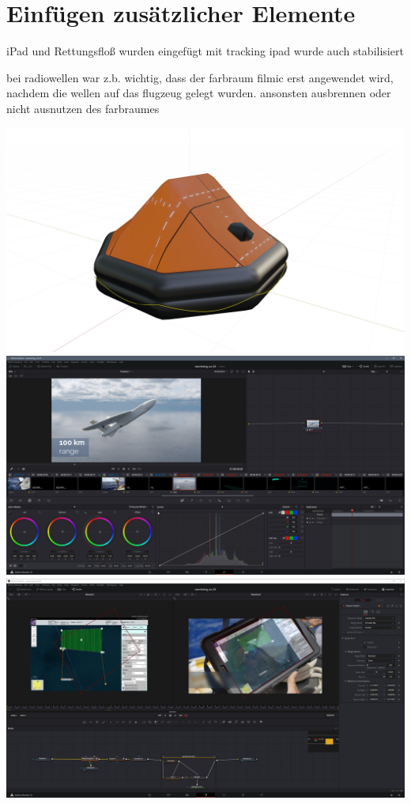\section{Einfügen zusätzlicher Elemente}

iPad und Rettungsfloß wurden eingefügt mit tracking
ipad wurde auch stabilisiert

bei radiowellen war z.b. wichtig, dass der farbraum filmic erst angewendet wird, nachdem die wellen auf das flugzeug gelegt wurden. ansonsten ausbrennen oder nicht ausnutzen des farbraumes

\includegraphics[width=\textwidth]{gfx/prod/boat/liferaft1.jpg}
\includegraphics[width=\textwidth]{gfx/post/resolve7.jpg}
\includegraphics[width=\textwidth]{gfx/post/resolve8.jpg}
